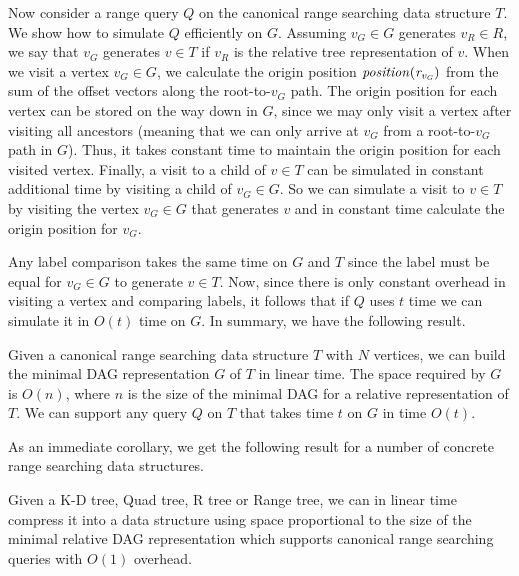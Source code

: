 Now consider a range query $Q$ on the canonical range searching data structure $T$. We show how to simulate $Q$ efficiently on $G$. Assuming $v_G \in G$ generates $v_R \in R$, we say that $v_G$ generates $v \in T$ if $v_R$ is the relative tree representation of $v$. When we visit a vertex $v_G \in G$, we calculate the origin position $\mathit{position}(\mathit{r_{v_G}})$ from the sum of the offset vectors along the root-to-$v_G$ path. The origin position for each vertex can be stored on the way down in $G$, since we may only visit a vertex after visiting all ancestors (meaning that we can only arrive at $v_G$ from a root-to-$v_G$ path in $G$). Thus, it takes constant time to maintain the origin position for each visited vertex. Finally, a visit to a child of $v \in T$ can be simulated in constant additional time by visiting a child of $v_G \in G$. So we can simulate a visit to $v \in T$ by visiting the vertex $v_G \in G$ that generates $v$ and in constant time calculate the origin position for $v_G$. 

Any label comparison takes the same time on $G$ and $T$ since the label must be equal for $v_G \in G$ to generate $v \in T$. Now, since there is only constant overhead in visiting a vertex and comparing labels, it follows that if $Q$ uses $t$ time we can simulate it in $O(t)$ time on $G$. In summary, we have the following result.

\begin{theorem}\label{thm:compCan}
	Given a canonical range searching data structure $T$ with $N$ vertices, we can build the minimal DAG representation $G$ of $T$ in linear time. The space required by $G$ is $O(n)$, where $n$ is the size of the minimal DAG for a relative representation of $T$. We can support any query $Q$ on $T$ that takes time $t$ on $G$ in time $O(t)$. 
\end{theorem} 
As an immediate corollary, we get the following result for a number of concrete range searching data structures.
\begin{corollary}
	Given a K-D tree, Quad tree, R tree or Range tree, we can in linear time compress it into a data structure using space proportional to the size of the minimal relative DAG representation which supports canonical range searching queries with $O(1)$ overhead.
\end{corollary}


